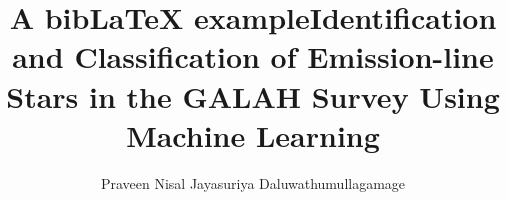 \documentclass[mres, copyrightpage, examinerscopy]{mqthesis}
\title{A bibLaTeX example}
\begin{document}
\frontmatter

\title{Identification and Classification of Emission-line Stars in the GALAH Survey Using Machine Learning}
\author{Praveen Nisal Jayasuriya Daluwathumullagamage}

\titlepage


%


\tableofcontents
\listoffigures
\listoftables

\mainmatter










\let\cleardoublepage\clearpage







\appendix






\backmatter

%




\printbibliography
\end{document}
